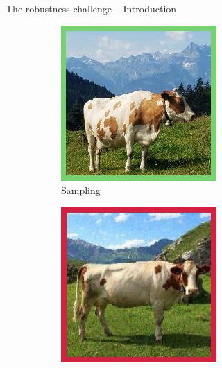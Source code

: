 \begin{frame}{The robustness challenge -- Introduction}
\begin{figure}
\begin{subfigure}[b]{0.22\textwidth}
			\includegraphics[width=\textwidth]{img/introduction/cow_noise.jpg}
			\caption{Sampling}
		\end{subfigure}
		\hfill
		\begin{subfigure}[b]{0.22\textwidth}
			\centering
			\includegraphics[width=\textwidth]{img/introduction/cow_fgsm.jpg}

\end{subfigure}
\end{figure}
\end{frame}
